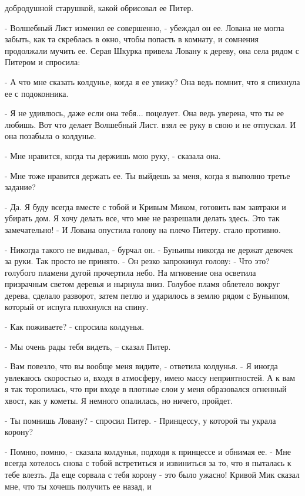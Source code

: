 добродушной старушкой, какой обрисовал ее Питер.
\par- Волшебный Лист изменил ее совершенно, - убеждал он ее.
 Лована не могла забыть, как та скреблась в окно, чтобы попасть 
в комнату, и сомнения продолжали мучить ее.
 Серая Шкурка привела Ловану к дереву, она села рядом с 
Питером и спросила:
\par- А что мне сказать колдунье, когда я ее увижу? Она ведь помнит, 
что я спихнула ее с подоконника.
\par- Я не удивлюсь, даже если она тебя... поцелует. Она ведь уверена, 
что ты ее любишь. Вот что делает Волшебный Лист.
 взял ее руку в свою и не отпускал. И она позабыла о колдунье.
\par- Мне нравится, когда ты держишь мою руку, - сказала она.
\par- Мне тоже нравится держать ее. Ты выйдешь за меня, когда я 
выполню третье задание?
\par- Да. Я буду всегда вместе с тобой и Кривым Миком, готовить вам 
завтраки и убирать дом. Я хочу делать все, что мне не разрешали делать 
здесь. Это так замечательно! - И Лована опустила голову на плечо 
Питеру.
 стало противно.
\par- Никогда такого не видывал, - бурчал он. - Буньипы никогда не 
держат девочек за руки. Так просто не принято. - Он резко запрокинул 
голову: - Что это?
 голубого пламени дугой прочертила небо. На мгновение она 
осветила призрачным светом деревья и нырнула вниз. Голубое пламя 
облетело вокруг дерева, сделало разворот, затем петлю и ударилось в 
землю рядом с Буньипом, который от испуга плюхнулся на спину.
\par- Как поживаете? - спросила колдунья.
\par- Мы очень рады тебя видеть, -- сказал Питер.
\par- Вам повезло, что вы вообще меня видите, - ответила колдунья. - Я 
иногда увлекаюсь скоростью и, входя в атмосферу, имею массу 
неприятностей. А к вам я так торопилась, что при входе в плотные слои 
у меня образовался огненный хвост, как у кометы. Я немного опалилась, 
но ничего, пройдет.
\par- Ты помнишь Ловану? - спросил Питер. - Принцессу, у которой ты 
украла корону?
\par- Помню, помню, - сказала колдунья, подходя к принцессе и обнимая 
ее. - Мне всегда хотелось снова с тобой встретиться и извиниться за 
то, что я пыталась к тебе влезть. Да еще сорвала с тебя корону - это 
было ужасно! Кривой Мик сказал мне, что ты хочешь получить ее назад, и 

